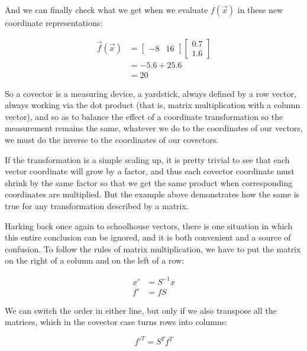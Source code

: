 And we can finally check what we get when we evaluate $f(\vec{x})$ in these new coordinate representations:

\begin{equation}
\begin{split}
    \vec{f}(\vec{x}) &= \begin{bmatrix} -8 & 16 \end{bmatrix} \begin{bmatrix} 0.7 \\ 1.6 \end{bmatrix} \\
    &= -5.6 + 25.6 \\
    &= 20
\end{split}
\end{equation}

So a covector is a measuring device, a yardstick, always defined by a row vector, always working via the dot product (that is, matrix multiplication with a column vector), and so as to balance the effect of a coordinate transformation so the measurement remains the same, whatever we do to the coordinates of our vectors, we must do the inverse to the coordinates of our covectors.

If the transformation is a simple scaling up, it is pretty trivial to see that each vector coordinate will grow by a factor, and thus each covector coordinate must shrink by the same factor so that we get the same product when corresponding coordinates are multiplied. But the example above demonstrates how the same is true for any transformation described by a matrix.

Harking back once again to schoolhouse vectors, there is one situation in which this entire conclusion can be ignored, and it is both convenient and a source of confusion. To follow the rules of matrix multiplication, we have to put the matrix on the right of a column and on the left of a row:

\begin{equation}
    \begin{split}
        x' &= S^{-1} x \\
        f' &= f S        
    \end{split}
\end{equation}

We can switch the order in either line, but only if we also transpose all the matrices, which in the covector case turns rows into columns:

$$
f'^T = S^T f^T 
$$

